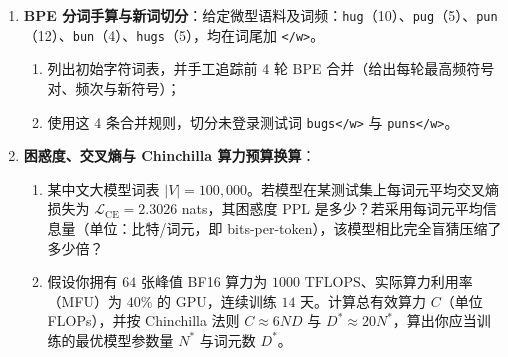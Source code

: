 \begin{enumerate}
  \item[\textbf{5.5.1}] \textbf{BPE 分词手算与新词切分}：给定微型语料及词频：\texttt{hug}（10）、\texttt{pug}（5）、\texttt{pun}（12）、\texttt{bun}（4）、\texttt{hugs}（5），均在词尾加 \texttt{</w>}。
  \begin{enumerate}
    \item 列出初始字符词表，并手工追踪前 4 轮 BPE 合并（给出每轮最高频符号对、频次与新符号）；
    \item 使用这 4 条合并规则，切分未登录测试词 \texttt{bugs</w>} 与 \texttt{puns</w>}。
  \end{enumerate}

  \item[\textbf{5.5.2}] \textbf{困惑度、交叉熵与 Chinchilla 算力预算换算}：
  \begin{enumerate}
    \item 某中文大模型词表 $|V| = 100{,}000$。若模型在某测试集上每词元平均交叉熵损失为 $\mathcal{L}_{\mathrm{CE}} = 2.3026$ nats，其困惑度 $\mathrm{PPL}$ 是多少？若采用每词元平均信息量（单位：比特/词元，即 bits-per-token），该模型相比完全盲猜压缩了多少倍？
    \item 假设你拥有 $64$ 张峰值 BF16 算力为 $1000\text{ TFLOPS}$、实际算力利用率（MFU）为 $40\%$ 的 GPU，连续训练 $14$ 天。计算总有效算力 $C$（单位 FLOPs），并按 Chinchilla 法则 $C \approx 6ND$ 与 $D^* \approx 20 N^*$，算出你应当训练的最优模型参数量 $N^*$ 与词元数 $D^*$。
  \end{enumerate}
\end{enumerate}


